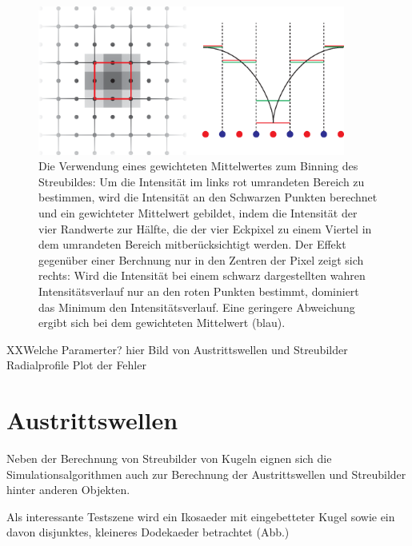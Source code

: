 \begin{figure}
	\centering
	\includegraphics[width=0.9\textwidth]{images/average.eps}
	\caption[Gewichteter Mittelwert]{Die Verwendung eines gewichteten Mittelwertes zum Binning des Streubildes: Um die Intensität im links rot umrandeten Bereich zu bestimmen, wird die Intensität an den Schwarzen Punkten berechnet und ein gewichteter Mittelwert gebildet, indem die Intensität der vier Randwerte zur Hälfte, die der vier Eckpixel zu einem Viertel in dem umrandeten Bereich mitberücksichtigt werden. Der Effekt gegenüber einer Berchnung nur in den Zentren der Pixel zeigt sich rechts: Wird die Intensität bei einem schwarz dargestellten wahren Intensitätsverlauf nur an den roten Punkten bestimmt, dominiert das Minimum den Intensitätsverlauf. Eine geringere Abweichung ergibt sich bei dem gewichteten Mittelwert (blau).}
	\label{Abb:BspAbbildung}
\end{figure} 






XXWelche Paramerter?
hier Bild von Austrittswellen und Streubilder
Radialprofile
Plot der Fehler



\section{Austrittswellen}
Neben der Berechnung von Streubilder von Kugeln eignen sich die Simulationsalgorithmen auch zur Berechnung der Austrittswellen und Streubilder hinter anderen Objekten.

Als interessante Testszene wird ein Ikosaeder mit eingebetteter Kugel sowie ein davon disjunktes, kleineres Dodekaeder betrachtet (Abb.)


